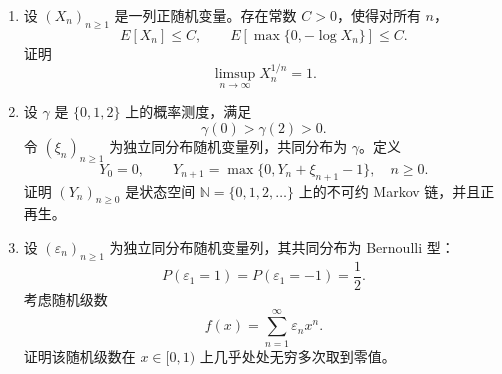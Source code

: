 \documentclass[UTF8,12pt]{ctexart}
\begin{document}
\begin{enumerate}[label=\textbf{\arabic*)},leftmargin=2.2em]
\item 设 \((X_n)_{n\ge1}\) 是一列正随机变量。存在常数 \(C>0\)，使得对所有 \(n\)，
\[
E[X_n]\le C,\qquad E[\max\{0,-\log X_n\}]\le C.
\]
证明
\[
\limsup_{n\to\infty}X_n^{1/n}=1.
\]

\item 设 \(\gamma\) 是 \(\{0,1,2\}\) 上的概率测度，满足
\[
\gamma(0)>\gamma(2)>0.
\]
令 \((\xi_n)_{n\ge1}\) 为独立同分布随机变量列，共同分布为 \(\gamma\)。定义
\[
Y_0=0,\qquad
Y_{n+1}=\max\{0,Y_n+\xi_{n+1}-1\},\quad n\ge0.
\]
证明 \((Y_n)_{n\ge0}\) 是状态空间 \(\mathbb N=\{0,1,2,\ldots\}\) 上的不可约 Markov 链，并且正再生。

\item 设 \((\varepsilon_n)_{n\ge1}\) 为独立同分布随机变量列，其共同分布为 Bernoulli 型：
\[
P(\varepsilon_1=1)=P(\varepsilon_1=-1)=\frac12.
\]
考虑随机级数
\[
f(x)=\sum_{n=1}^{\infty}\varepsilon_n x^n.
\]
证明该随机级数在 \(x\in[0,1)\) 上几乎处处无穷多次取到零值。


\end{enumerate}
\end{document}
